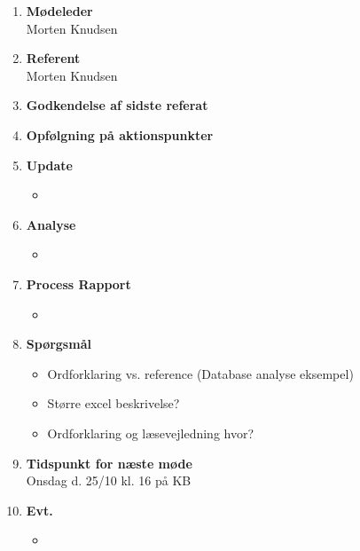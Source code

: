 	\begin{enumerate}
		\itemsep 0.3em 
		\item \textbf{Mødeleder}\\
			Morten Knudsen
		\item \textbf{Referent}\\
			Morten Knudsen
		\item \textbf{Godkendelse af sidste referat}
			
		\item\textbf{Opfølgning på aktionspunkter}

		\item \textbf{Update}
			\begin{itemize}[-]
				\item 
			\end{itemize}
	
		\item \textbf{Analyse}
		\begin{itemize}[-]
			\item 
		\end{itemize}
	
			\item \textbf{Process Rapport}
		\begin{itemize}[-]
			\item
		\end{itemize}
	
		\item \textbf{Spørgsmål}
			\begin{itemize}[-]
				\item Ordforklaring vs. reference (Database analyse eksempel)
				\item Større excel beskrivelse?
				\item Ordforklaring og læsevejledning hvor?
			\end{itemize}
	
		\item \textbf{Tidspunkt for næste møde} \\
			Onsdag d. 25/10 kl. 16 på KB
			
		\item \textbf{Evt.}
			\begin{itemize}[-]
				\item 
			\end{itemize}
			
	\end{enumerate}
